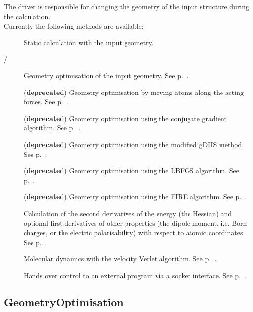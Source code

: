 The driver is responsible for changing the geometry of the input
structure during the calculation.\\ \bigskip Currently the following
methods are available:
\begin{description}
\item[\iscb{}] Static calculation with the input geometry.
\item[ / ] Geometry
  optimisation of the input geometry.  See
  p.~.
\item[] (\textbf{deprecated}) Geometry optimisation by moving atoms
  along the acting forces. See p.~.
\item[] (\textbf{deprecated}) Geometry optimisation using the
  conjugate gradient algorithm. See p.~.
\item[] (\textbf{deprecated}) Geometry optimisation using the modified gDIIS
  method. See p.~.
\item[] (\textbf{deprecated}) Geometry optimisation using the LBFGS
  algorithm. See p.~.
\item[] (\textbf{deprecated}) Geometry optimisation using the FIRE
  algorithm. See p.~.
\item[] Calculation of the second derivatives
  of the energy (the Hessian) and optional first
  derivatives of other properties (the dipole moment, i.e. Born charges, or the electric polarisability) with respect
  to atomic coordinates. See p.~.
\item[] Molecular dynamics with the velocity
  Verlet algorithm. See p.~.
\item[] Hands over control to an external program via a socket
  interface. See p.~.
\end{description}


\subsection{GeometryOptimisation}
\label{sec:dftbp.GeometryOptimisation}

